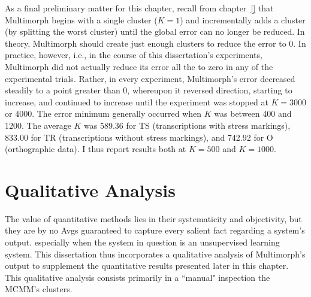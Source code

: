 As a final preliminary matter for this chapter, recall from chapter~\ref{}  that Multimorph begins with a single cluster ($K = 1$) 
and incrementally adds a cluster (by splitting the worst cluster) until the global error can no longer be reduced. %
In theory, Multimorph should create just enough clusters to reduce the error
to 0. In practice, however, i.e., in the course of this dissertation's experiments, Multimorph did not actually reduce its error all the to zero in any of the experimental trials. Rather, in every experiment, Multimorph's error decreased steadily to a point greater than 0, whereupon it reversed direction, starting to 
increase, and continued to increase until the experiment was stopped at $K = 3000$ or $4000$.  The error minimum generally occurred when $K$ was between 400 and 1200. 
The average $K$ was 589.36 for TS (transcriptions with stress markings), 833.00 for TR (transcriptions without stress markings), and 742.92 for O (orthographic data). I thus 
report results both at $K = 500$ and $K = 1000$.

\section{Qualitative Analysis}
\label{sec:qual}
The value of quantitative methods lies in their systematicity and objectivity, but
	they are by no Avgs guaranteed to capture every salient fact regarding a system's output. 
	especially when the system in question is an unsupervised learning system. 
	 This dissertation thus incorporates a qualitative analysis of Multimorph's output to supplement the  
	 quantitative results presented later in this chapter.
	This qualitative analysis consists primarily in a ``manual" inspection the MCMM's clusters.
	

